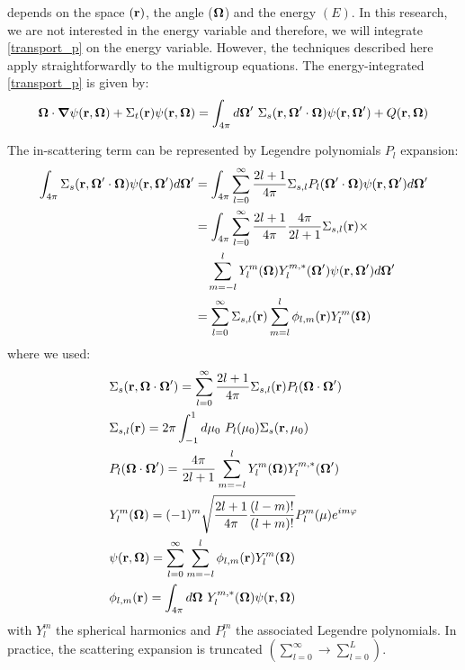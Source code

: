  depends on the space $(\mathbf{r})$, the angle ($\boldsymbol{\Omega}$) and the
energy $(E)$. In this research, we are not interested in the energy variable
and therefore, we will integrate \cref{transport_p} on the energy variable. 
However, the techniques described here apply straightforwardly to the multigroup 
equations. The energy-integrated \cref{transport_p} is given by:
\begin{equation}
\bo\cdot \bn \psi(\br,\bo) + \Sigma_t(\br)\psi(\br,\bo) =
\int_{4\pi}d\bo'\ \Sigma_s(\br,\bo'\cdot\bo)\psi(\br,\bo')+Q(\br,\bo)
\label{transport_p2}
\end{equation}

The in-scattering term can be represented by Legendre polynomials $P_l$ expansion:
\begin{equation}
\begin{split}
\int_{4\pi} \Sigma_s(\mathbf{r},\boldsymbol{\Omega}'\cdot\boldsymbol{\Omega}) \psi(\mathbf{r},\boldsymbol{\Omega}') d\boldsymbol{\Omega}' &=
\int_{4\pi} \sum_{l=0}^{\infty} \frac{2l+1}{4\pi} \Sigma_{s,l} P_l(\boldsymbol{\Omega}'\cdot\boldsymbol{\Omega})
\psi(\mathbf{r},\boldsymbol{\Omega}') d\boldsymbol{\Omega}'\\
&= \int_{4\pi} \sum_{l=0}^{\infty} \frac{2l+1}{4\pi}\frac{4\pi}{2l+1}
\Sigma_{s,l}(\mathbf{r}) \times\\
&\quad \sum_{m=-l}^{l} Y_l^m(\boldsymbol{\Omega})Y_l^{m,*}(\boldsymbol{\Omega}') \psi(\mathbf{r},\boldsymbol{\Omega}')d\boldsymbol{\Omega}'\\
&= \sum_{l=0}^{\infty} \Sigma_{s,l}(\mathbf{r}) \sum_{m=l}^l \phi_{l,m}(\mathbf{r})
Y_l^m(\boldsymbol{\Omega})
\end{split}
\end{equation}
where we used:
\begin{align}
&\Sigma_s(\br,\bo\cdot\bo') = \sum_{l=0}^{\infty} \frac{2l+1}{4\pi}
\Sigma_{s,l}(\br) P_l(\bo\cdot\bo')\\
&\Sigma_{s,l}(\br) = 2\pi \int_{-1}^1 d\mu_0\ P_l(\mu_0) \Sigma_s(\br,\mu_0)\\
& P_l(\bo\cdot\bo') = \frac{4\pi}{2l+1} \sum_{m=-l}^l
Y_l^m(\bo)Y_l^{m,*}(\bo')\\
& Y_l^m(\bo) = (-1)^m \sqrt{\frac{2l+1}{4\pi} \frac{(l-m)!}{(l+m)!}} P_l^m(\mu)
e^{im\varphi}\\
&\psi(\br,\bo) = \sum_{l=0}^{\infty}\sum_{m=-l}^l \phi_{l,m}(\br) Y_l^m(\bo)
\label{ang_flux}\\
&\phi_{l,m}(\br) = \int_{4\pi} d\bo\ Y_{l}^{m,*}(\bo) \psi(\br,\bo)
\label{moments}
\end{align}
with $Y_l^m$ the spherical harmonics and $P_l^m$ the associated
Legendre polynomials. In practice, the scattering expansion is truncated 
$(\sum_{l=0}^{\infty}\rightarrow \sum_{l=0}^L)$.\\
